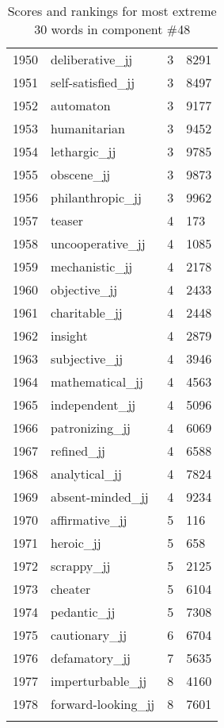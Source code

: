 \begin{longtable}[!htbp]{| rlr@{.}l |}
    1950 & deliberative\_jj & 3 & 8291 \\
    1951 & self-satisfied\_jj & 3 & 8497 \\
    1952 & automaton & 3 & 9177 \\
    1953 & humanitarian & 3 & 9452 \\
    1954 & lethargic\_jj & 3 & 9785 \\
    1955 & obscene\_jj & 3 & 9873 \\
    1956 & philanthropic\_jj & 3 & 9962 \\
    1957 & teaser & 4 & 173 \\
    1958 & uncooperative\_jj & 4 & 1085 \\
    1959 & mechanistic\_jj & 4 & 2178 \\
    1960 & objective\_jj & 4 & 2433 \\
    1961 & charitable\_jj & 4 & 2448 \\
    1962 & insight & 4 & 2879 \\
    1963 & subjective\_jj & 4 & 3946 \\
    1964 & mathematical\_jj & 4 & 4563 \\
    1965 & independent\_jj & 4 & 5096 \\
    1966 & patronizing\_jj & 4 & 6069 \\
    1967 & refined\_jj & 4 & 6588 \\
    1968 & analytical\_jj & 4 & 7824 \\
    1969 & absent-minded\_jj & 4 & 9234 \\
    1970 & affirmative\_jj & 5 & 116 \\
    1971 & heroic\_jj & 5 & 658 \\
    1972 & scrappy\_jj & 5 & 2125 \\
    1973 & cheater & 5 & 6104 \\
    1974 & pedantic\_jj & 5 & 7308 \\
    1975 & cautionary\_jj & 6 & 6704 \\
    1976 & defamatory\_jj & 7 & 5635 \\
    1977 & imperturbable\_jj & 8 & 4160 \\
    1978 & forward-looking\_jj & 8 & 7601 \\
    \hline
    \caption{Scores and rankings for most extreme 30 words in component \#48} \\
\end{longtable}
